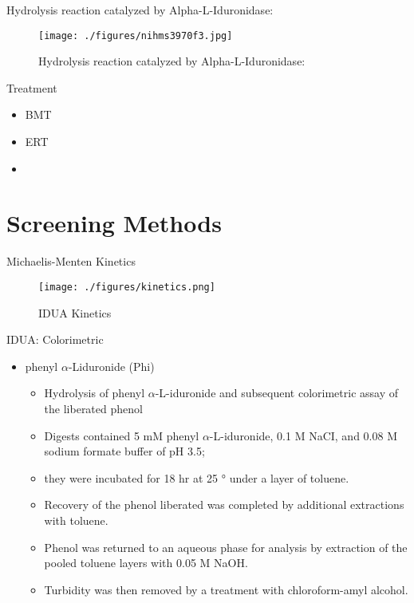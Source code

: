 \documentclass[presentation, smaller]{beamer}
\begin{document}
\begin{frame}[label={sec:orgheadline2}]{Hydrolysis reaction catalyzed by Alpha-L-Iduronidase:}
\begin{figure}[htb]
\centering
\texttt{[image: ./figures/nihms3970f3.jpg]}
\caption[mech]{\label{fig:mech}
Hydrolysis reaction catalyzed by Alpha-L-Iduronidase:}
\end{figure}
\end{frame}

\begin{frame}[label={sec:orgheadline3}]{Treatment}
\begin{itemize}
\item BMT
\item ERT
\item 
\end{itemize}
\end{frame}

\section{Screening Methods}
\label{sec:orgheadline12}

\begin{frame}[label={sec:orgheadline5}]{Michaelis-Menten Kinetics}
\begin{figure}[htb]
\centering
\texttt{[image: ./figures/kinetics.png]}
\caption{\label{fig:mm}
IDUA Kinetics}
\end{figure}
\end{frame}



\begin{frame}[label={sec:orgheadline6}]{IDUA: Colorimetric}
\begin{itemize}
\item phenyl \(\alpha\)-Liduronide (Phi)
\begin{itemize}
\item Hydrolysis of phenyl \(\alpha\)-L-iduronide and subsequent
colorimetric assay of the liberated phenol
\item Digests contained 5 mM phenyl \(\alpha\)-L-iduronide, 0.1 M NaCI,
and 0.08 M sodium formate buffer of pH 3.5;
\item they were incubated for 18 hr at 25 ° under a layer of toluene.
\item Recovery of the phenol liberated was completed by additional extractions with toluene.
\item Phenol was returned to an aqueous phase for analysis by extraction of the pooled toluene layers with 0.05 M NaOH.
\item Turbidity was then removed by a treatment with chloroform-amyl alcohol.
\end{itemize}
\end{itemize}
\end{frame}
\end{document}
